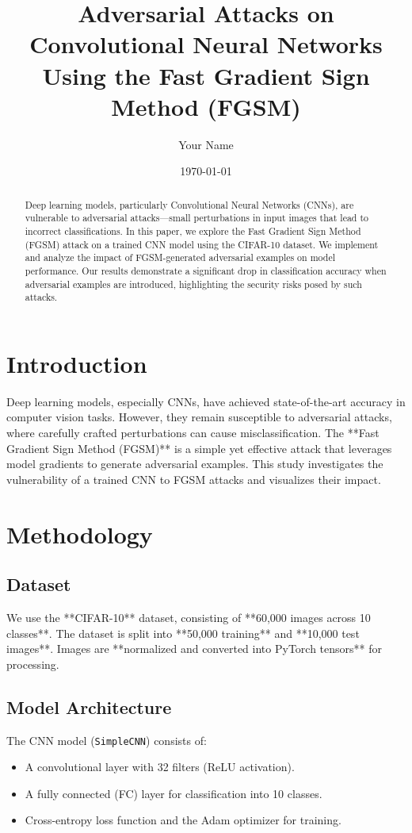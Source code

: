 \documentclass{article}
\title{Adversarial Attacks on Convolutional Neural Networks Using the Fast Gradient Sign Method (FGSM)}
\author{Your Name}
\date{\today}
\begin{document}
\maketitle

\begin{abstract}
Deep learning models, particularly Convolutional Neural Networks (CNNs), are vulnerable to adversarial attacks—small perturbations in input images that lead to incorrect classifications. In this paper, we explore the Fast Gradient Sign Method (FGSM) attack on a trained CNN model using the CIFAR-10 dataset. We implement and analyze the impact of FGSM-generated adversarial examples on model performance. Our results demonstrate a significant drop in classification accuracy when adversarial examples are introduced, highlighting the security risks posed by such attacks.
\end{abstract}

\section{Introduction}
Deep learning models, especially CNNs, have achieved state-of-the-art accuracy in computer vision tasks. However, they remain susceptible to adversarial attacks, where carefully crafted perturbations can cause misclassification. The **Fast Gradient Sign Method (FGSM)** is a simple yet effective attack that leverages model gradients to generate adversarial examples. This study investigates the vulnerability of a trained CNN to FGSM attacks and visualizes their impact.

\section{Methodology}

\subsection{Dataset}
We use the **CIFAR-10** dataset, consisting of **60,000 images across 10 classes**. The dataset is split into **50,000 training** and **10,000 test images**. Images are **normalized and converted into PyTorch tensors** for processing.

\subsection{Model Architecture}
The CNN model (\texttt{SimpleCNN}) consists of:
\begin{itemize}
    \item A convolutional layer with 32 filters (ReLU activation).
    \item A fully connected (FC) layer for classification into 10 classes.
    \item Cross-entropy loss function and the Adam optimizer for training.
\end{itemize}
\end{document}

